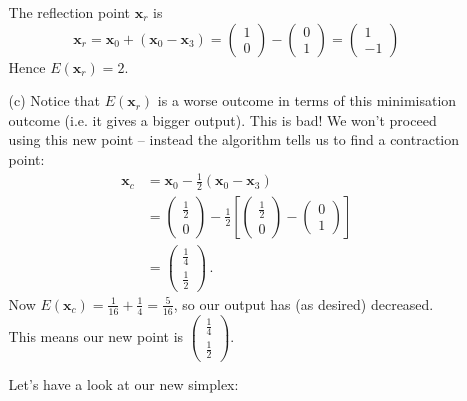 \documentclass[11pt,a4paper]{scrartcl}
\begin{document}
\begin{enumerate}
\begin{enumerate}
    The reflection point $\mathbf{x}_r$ is 
    \[
    \mathbf{x}_r = \mathbf{x}_0 + (\mathbf{x}_0 -\mathbf{x}_3) = 
    \begin{pmatrix}
        1\\0
        \end{pmatrix}-
        \begin{pmatrix}
        0\\1
        \end{pmatrix}        
         =
         \begin{pmatrix}
        1\\-1
        \end{pmatrix}        
    \]
    Hence $E(\mathbf{x}_r) = 2$. 
    \item[(c)] Notice that $E(\mathbf{x}_r)$ is a worse outcome in terms of this minimisation outcome (i.e. it gives a bigger output). This is bad! We won't proceed using this new point -- instead the algorithm tells us to find a contraction point:
    \begin{align*}
     \mathbf{x}_c &= \mathbf{x}_0 - \frac12 (\mathbf{x}_0 -\mathbf{x}_3) \\
     &= 
    \begin{pmatrix}
        \frac12 \\0
        \end{pmatrix}-\frac12\left[
        \begin{pmatrix}
        \frac12 \\0
        \end{pmatrix}       
        - 
        \begin{pmatrix}
        0\\1
        \end{pmatrix}       
        \right]\\
         &=
         \begin{pmatrix}
        \frac14\\\frac12
        \end{pmatrix}   \,.  
    \end{align*}
    Now $E(\mathbf{x}_c) = \frac1{16} + \frac1{4} = \frac5{16}
$, so our output has (as desired) decreased. This means our new point is    $      \begin{pmatrix}
        \frac14\\\frac12
        \end{pmatrix}$.

Let's have a look at our new simplex:\\


\end{enumerate}
\end{enumerate}
\end{document}
